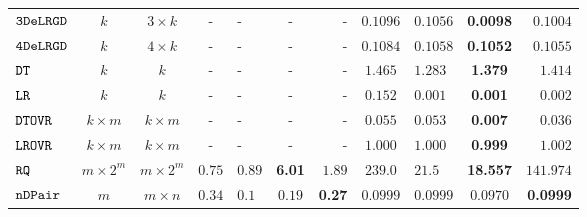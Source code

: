 {\begin {table}[t]
\begin{center}
{\begin{tabular}{|| >{\tiny}l || c | c || c | l | c | r || c | l | c | r || }
         \hhline{||-||---||-||--||----||}
         $  \mathtt{ 3DeLRGD }$ & $ k $ & $  3\times k $ & -  & - & - & - & $0.1096$   & $0.1056$ & \textbf{0.0098} & $0.1004$  \\
         \hhline{||-||---||-||--||----||}
         $  \mathtt{ 4DeLRGD }$ & $ k $ & $  4\times k $  & -  & - & - & -  & $0.1084$   & $0.1058$ & \textbf{0.1052} & $0.1055$   \\
         \hhline{||-||---||-||--||----||}
        $\mathtt{DT}$ & $k$ &  $k$ & -  & - & - & - & $ 1.465$  & $ 1.283$ & \textbf{1.379 } & {$1.414$}   \\
         \hhline{||-||---||-||--||----||}
         $\mathtt{LR}$ & $k$ &  $k$ & -  & - & - & - & $ 0.152$  &  $ 0.001$ & {\textbf{0.001}} & {$0.002$}   \\
        $\mathtt{DTOVR}$ & $k \times m$ &  $ k \times m $  & -  & - & - & - &  $0.055$ & $0.053$  &  {\textbf{0.007}} & $0.036$  \\
        \hhline{||-||---||-||--||----||}
        $\mathtt{LROVR}$  & $k \times m$ &  $ k \times m $  & -  & - & - & -  &  $ 1.000  $  &  $ 1.000 $ & {\textbf{ 0.999}} & $ 1.002 $  \\
        \hhline{||-||---||-||--||----||}
        $\mathtt{RQ}$~\cite{Jamieson2015TheAO} & $ m \times 2^m $ & $  m \times 2^m $  & $0.75$  & $0.89$ & \textbf{6.01} & $1.89$ & $239.0$   & $21.5$ & {\textbf{18.557}} & $141.974$   \\
        \hhline{||-||---||-||--||----||}
        $\mathtt{nDPair}$~\cite{Jamieson2015TheAO} & $ m $ & $  m \times n  $   & $0.34$  & $0.1$ & $0.19$ & \textbf{0.27} & $0.0999$   & $0.0999$ & $0.0970$ & \textbf{0.0999}   \\

\end{tabular}}
\end{center}
\end{table}}
